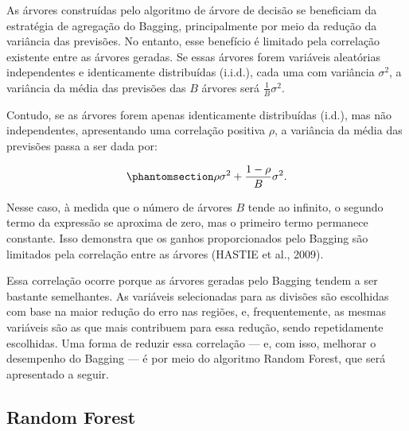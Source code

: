 \documentclass[
  12pt,
  a4paper,
]{scrreprt}
\begin{document}
\vspace{12pt}

As árvores construídas pelo algoritmo de árvore de decisão se beneficiam
da estratégia de agregação do Bagging, principalmente por meio da
redução da variância das previsões. No entanto, esse benefício é
limitado pela correlação existente entre as árvores geradas. Se essas
árvores forem variáveis aleatórias independentes e identicamente
distribuídas (i.i.d.), cada uma com variância \(\sigma^2\), a variância
da média das previsões das \(B\) árvores será \(\frac{1}{B} \sigma^2\).

\vspace{12pt}

Contudo, se as árvores forem apenas identicamente distribuídas (i.d.),
mas não independentes, apresentando uma correlação positiva \(\rho\), a
variância da média das previsões passa a ser dada por:

\begin{equation}\phantomsection\label{eq-cor}{
\rho \sigma^2 + \frac{1 - \rho}{B}\sigma^2\text{.}
}\end{equation}

Nesse caso, à medida que o número de árvores \(B\) tende ao infinito, o
segundo termo da expressão se aproxima de zero, mas o primeiro termo
permanece constante. Isso demonstra que os ganhos proporcionados pelo
Bagging são limitados pela correlação entre as árvores (HASTIE et al.,
2009).

\vspace{12pt}

Essa correlação ocorre porque as árvores geradas pelo Bagging tendem a
ser bastante semelhantes. As variáveis selecionadas para as divisões são
escolhidas com base na maior redução do erro nas regiões, e,
frequentemente, as mesmas variáveis são as que mais contribuem para essa
redução, sendo repetidamente escolhidas. Uma forma de reduzir essa
correlação --- e, com isso, melhorar o desempenho do Bagging --- é por
meio do algoritmo Random Forest, que será apresentado a seguir.

\subsection{Random Forest}\label{random-forest}
\end{document}
